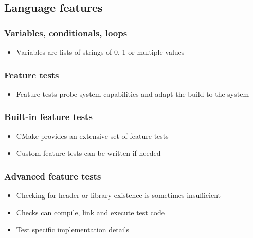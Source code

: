 \documentclass{beamer}
\begin{document}
\subsection{Language features}

\begin{frame}
  \frametitle{Variables, conditionals, loops}

  

  \begin{itemize}
  \item Variables are lists of strings of 0, 1 or multiple values
  \end{itemize}
\end{frame}

\begin{frame}
  \frametitle{Feature tests}

  

  \begin{itemize}
  \item Feature tests probe system capabilities and adapt the build to the system
  \end{itemize}
\end{frame}

\begin{frame}
  \frametitle{Built-in feature tests}

  

  \begin{itemize}
  \item CMake provides an extensive set of feature tests
  \item Custom feature tests can be written if needed
  \end{itemize}
\end{frame}

\begin{frame}
  \frametitle{Advanced feature tests}

  

  \begin{itemize}
  \item Checking for header or library existence is sometimes insufficient
  \item Checks can compile, link and execute test code
  \item Test specific implementation details
  \end{itemize}
\end{frame}
\end{document}
